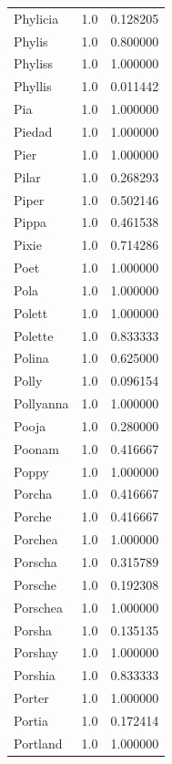\documentclass[
  letterpaper,
  DIV=11,
  numbers=noendperiod]{scrreprt}
\begin{document}
\begin{tabular}{lrr}
Phylicia        &   1.0 &   0.128205 \\
Phylis          &   1.0 &   0.800000 \\
Phyliss         &   1.0 &   1.000000 \\
Phyllis         &   1.0 &   0.011442 \\
Pia             &   1.0 &   1.000000 \\
Piedad          &   1.0 &   1.000000 \\
Pier            &   1.0 &   1.000000 \\
Pilar           &   1.0 &   0.268293 \\
Piper           &   1.0 &   0.502146 \\
Pippa           &   1.0 &   0.461538 \\
Pixie           &   1.0 &   0.714286 \\
Poet            &   1.0 &   1.000000 \\
Pola            &   1.0 &   1.000000 \\
Polett          &   1.0 &   1.000000 \\
Polette         &   1.0 &   0.833333 \\
Polina          &   1.0 &   0.625000 \\
Polly           &   1.0 &   0.096154 \\
Pollyanna       &   1.0 &   1.000000 \\
Pooja           &   1.0 &   0.280000 \\
Poonam          &   1.0 &   0.416667 \\
Poppy           &   1.0 &   1.000000 \\
Porcha          &   1.0 &   0.416667 \\
Porche          &   1.0 &   0.416667 \\
Porchea         &   1.0 &   1.000000 \\
Porscha         &   1.0 &   0.315789 \\
Porsche         &   1.0 &   0.192308 \\
Porschea        &   1.0 &   1.000000 \\
Porsha          &   1.0 &   0.135135 \\
Porshay         &   1.0 &   1.000000 \\
Porshia         &   1.0 &   0.833333 \\
Porter          &   1.0 &   1.000000 \\
Portia          &   1.0 &   0.172414 \\
Portland        &   1.0 &   1.000000 \\

\end{tabular}
\end{document}
